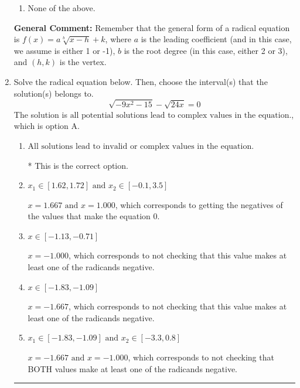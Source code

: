 \documentclass{extbook}[14pt]
\newcommand{\litem}[1]{\item #1

\rule{\textwidth}{0.4pt}}
\begin{document}
\begin{enumerate}
{\begin{enumerate}[label=\Alph*.]
\item None of the above.\end{enumerate}
\textbf{General Comment:} Remember that the general form of a radical equation is $ f(x) = a \sqrt[b]{x - h} + k $, where $a$ is the leading coefficient (and in this case, we assume is either 1 or -1), $b$ is the root degree (in this case, either 2 or 3), and $(h, k)$ is the vertex.
}
\litem{
Solve the radical equation below. Then, choose the interval(s) that the solution(s) belongs to.
\[ \sqrt{-9 x^2 - 15} - \sqrt{24 x} = 0 \]The solution is \( \text{all potential solutions lead to complex values in the equation.} \), which is option A.\begin{enumerate}[label=\Alph*.]
\item \( \text{All solutions lead to invalid or complex values in the equation.} \)

* This is the correct option.
\item \( x_1 \in [1.62, 1.72] \text{ and } x_2 \in [-0.1,3.5] \)

$x = 1.667 \text{ and } x = 1.000$, which corresponds to getting the negatives of the values that make the equation 0.
\item \( x \in [-1.13,-0.71] \)

$x = -1.000$, which corresponds to not checking that this value makes at least one of the radicands negative.
\item \( x \in [-1.83,-1.09] \)

$x = -1.667$, which corresponds to not checking that this value makes at least one of the radicands negative.
\item \( x_1 \in [-1.83, -1.09] \text{ and } x_2 \in [-3.3,0.8] \)

$x = -1.667 \text{ and } x = -1.000$, which corresponds to not checking that BOTH values make at least one of the radicands negative.
\end{enumerate}

}
\end{enumerate}
\end{document}
